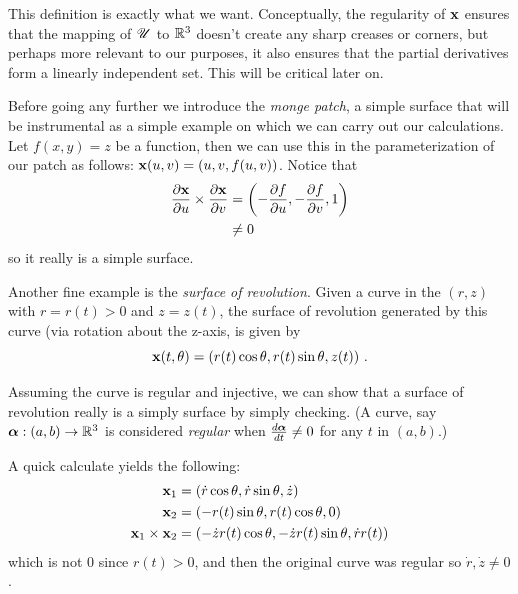 This definition is exactly what we want. Conceptually, the regularity of $\mathbf{x}$ ensures that the mapping of $\mathscr{U}$ to $\mathbb{R}^3$ doesn't create any sharp creases or corners, but perhaps more relevant to our purposes, it also ensures that the partial derivatives form a linearly independent set. This will be critical later on.

\begin{ex}
  Before going any further we introduce the \emph{monge patch}, a simple surface that will be instrumental as a simple example on which we can carry out our calculations. Let $f(x, y) = z$ be a function, then we can use this in the parameterization of our patch as follows: $\mathbf{x}(u, v) = (u, v, f(u, v))$. Notice that
  \begin{align*}
    \frac{\partial\mathbf{x}}{\partial u} \times \frac{\partial\mathbf{x}}{\partial v} &= \left(-\frac{\partial f}{\partial u}, -\frac{\partial f}{\partial v}, 1\right)\\
    &\neq 0
  \end{align*}
  so it really is a simple surface.
\end{ex}

\begin{ex}
  Another fine example is the \emph{surface of revolution}. Given a curve in the $(r, z)$ with $r = r(t) > 0$ and $z = z(t)$, the surface of revolution generated by this curve (via rotation about the z-axis, is given by
  \[
    \mathbf{x}(t, \theta) = (r(t)\cos\theta, r(t)\sin\theta, z(t)) \ .
  \]

  Assuming the curve is regular and injective, we can show that a surface of revolution really is a simply surface by simply checking. (A curve, say $\boldsymbol{\alpha} : (a, b) \to \mathbb{R}^3$ is considered \emph{regular} when $\frac{d\boldsymbol{\alpha}}{dt} \neq 0$ for any $t$ in $(a, b)$.)

  A quick calculate yields the following:
  \begin{align*}
    \mathbf{x}_1 &= (\dot{r}\cos{\theta}, \dot{r}\sin{\theta}, \dot{z})\\
    \mathbf{x}_2 &= (-r(t)\sin{\theta}, r(t)\cos{\theta}, 0)\\
    \mathbf{x}_1 \times \mathbf{x}_2 &= (-\dot{z} r(t) \cos{\theta}, -\dot{z} r(t) \sin{\theta}, \dot{r}r(t))
  \end{align*}
  which is not $0$ since $r(t) > 0$, and then the original curve was regular so $\dot{r}, \dot{z} \neq 0$.
\end{ex}


